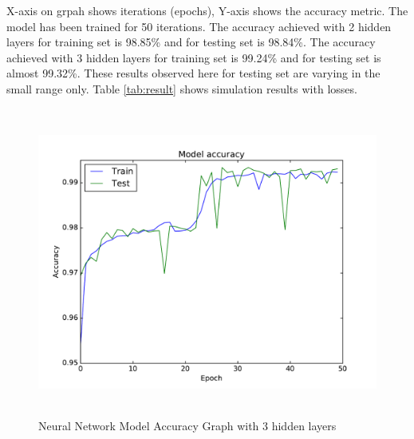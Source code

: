 \begin{table}[bp!]
\centering
\caption{Neural Network Model Result }
\label{tab:result}
\end{table}
\par
X-axis on grpah shows iterations (epochs), Y-axis shows the accuracy metric. The model has been trained for 50 iterations. The accuracy achieved with 2 hidden layers for training set is 98.85\% and for testing set is 98.84\%. The accuracy achieved with 3 hidden layers for training set is 99.24\% and for testing set is almost 99.32\%. These results observed here for testing set are varying in the small range only. Table \ref{tab:result} shows simulation results with losses.
\begin{figure}[h]
    \centering
    \includegraphics[width=5.5in, height=4in] {Figures/PDF/3hidden.pdf}
    \caption{Neural Network Model Accuracy Graph with 3 hidden layers}
    \label{3hidden}
\end{figure}

